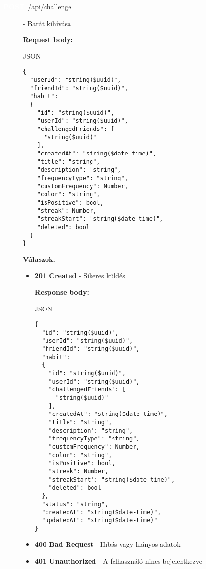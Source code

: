 \documentclass[12pt]{report}
\newcommand{\httpPost}[1]{\colorbox{postColor}{\textbf{\textcolor{white}{POST}}}~#1}
\begin{document}
\begin{description}
\begin{itemize}
      \end{itemize}

  \item[\httpPost{/api/challenge}] - Barát kihívása
  
    \vspace{0.5cm}
    \textbf{Request body:}
    \begin{codeblock}{JSON}
      \begin{verbatim}
{
  "userId": "string($uuid)",
  "friendId": "string($uuid)",
  "habit": 
  {
    "id": "string($uuid)",
    "userId": "string($uuid)",
    "challengedFriends": [
      "string($uuid)"
    ],
    "createdAt": "string($date-time)",
    "title": "string",
    "description": "string",
    "frequencyType": "string",
    "customFrequency": Number,
    "color": "string",
    "isPositive": bool,
    "streak": Number,
    "streakStart": "string($date-time)",
    "deleted": bool
  }
}
      \end{verbatim}
    \end{codeblock}

    \vspace{0.5cm}
    \textbf{Válaszok:}
    \begin{itemize}
      \item \textbf{201 Created} - Sikeres küldés

        \textbf{Response body:}
        \begin{codeblock}{JSON}
          \begin{verbatim}
{
  "id": "string($uuid)",
  "userId": "string($uuid)",
  "friendId": "string($uuid)",
  "habit": 
  {
    "id": "string($uuid)",
    "userId": "string($uuid)",
    "challengedFriends": [
      "string($uuid)"
    ],
    "createdAt": "string($date-time)",
    "title": "string",
    "description": "string",
    "frequencyType": "string",
    "customFrequency": Number,
    "color": "string",
    "isPositive": bool,
    "streak": Number,
    "streakStart": "string($date-time)",
    "deleted": bool
  },
  "status": "string",
  "createdAt": "string($date-time)",
  "updatedAt": "string($date-time)"
}
          \end{verbatim}
        \end{codeblock}

      \item \textbf{400 Bad Request} - Hibás vagy hiányos adatok

      \item \textbf{401 Unauthorized} - A felhasználó nincs bejelentkezve


\end{itemize}
\end{description}
\end{document}
